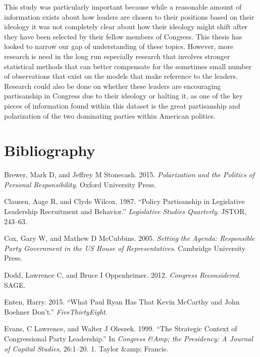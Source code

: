 \documentclass[12pt,twoside]{reedthesis}
\begin{document}
  \setcounter{chapter}{4} \setcounter{section}{0}
  
  This study was particularly important because while a reasonable amount
  of information exists about how leaders are chosen to their positions
  based on their ideology it was not completely clear about how their
  ideology might shift after they have been selected by their fellow
  members of Congress. This thesis has looked to narrow our gap of
  understanding of these topics. However, more research is need in the
  long run especially research that involves stronger statistical methods
  that can better compensate for the sometimes small number of
  observations that exist on the models that make reference to the
  leaders. Research could also be done on whether these leaders are
  encouraging partisanship in Congress due to their ideology or halting
  it, as one of the key pieces of information found within this dataset is
  the great partisanship and polarization of the two dominating parties
  within American politics.
  
  \backmatter
  
  \chapter{Bibliography}\label{bibliography}
  
  \noindent
  
  \setlength{\parindent}{-0.20in} \setlength{\leftskip}{0.20in}
  \setlength{\parskip}{8pt}
  
  Brewer, Mark D, and Jeffrey M Stonecash. 2015. \emph{Polarization and
  the Politics of Personal Responsibility}. Oxford University Press.
  
  Clausen, Aage R, and Clyde Wilcox. 1987. ``Policy Partisanship in
  Legislative Leadership Recruitment and Behavior.'' \emph{Legislative
  Studies Quarterly}. JSTOR, 243--63.
  
  Cox, Gary W, and Mathew D McCubbins. 2005. \emph{Setting the Agenda:
  Responsible Party Government in the US House of Representatives}.
  Cambridge University Press.
  
  Dodd, Lawrence C, and Bruce I Oppenheimer. 2012. \emph{Congress
  Reconsidered}. SAGE.
  
  Enten, Harry. 2015. ``What Paul Ryan Has That Kevin McCarthy and John
  Boehner Don't.'' \emph{FiveThirtyEight}.
  
  Evans, C Lawrence, and Walter J Oleszek. 1999. ``The Strategic Context
  of Congressional Party Leadership.'' In \emph{Congress \&Amp; the
  Presidency: A Journal of Capital Studies}, 26:1--20. 1. Taylor \&amp;
  Francis.
  
\end{document}
